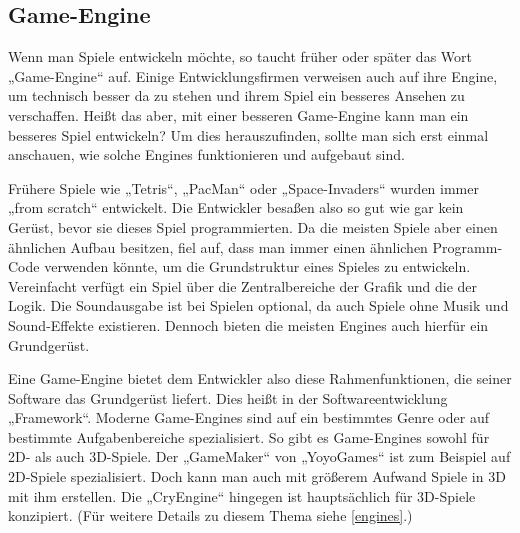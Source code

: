 \subsection{Game-Engine}	
\label{engine}
Wenn man Spiele entwickeln möchte, so taucht früher oder später das Wort „Game-Engine“ auf. Einige Entwicklungsfirmen verweisen auch auf ihre Engine, um technisch besser da zu stehen und ihrem Spiel ein besseres Ansehen zu verschaffen. Heißt das aber, mit einer besseren Game-Engine kann man ein besseres Spiel entwickeln? Um dies herauszufinden, sollte man sich erst einmal anschauen, wie solche Engines funktionieren und aufgebaut sind.

Frühere Spiele wie „Tetris“, „PacMan“ oder „Space-Invaders“ wurden immer „from scratch“  entwickelt.\cite{gea} Die Entwickler besaßen also so gut wie gar kein Gerüst, bevor sie dieses Spiel programmierten. Da die meisten Spiele aber einen ähnlichen Aufbau besitzen, fiel auf, dass man immer einen ähnlichen Programm-Code verwenden könnte, um die Grundstruktur eines Spieles zu entwickeln. Vereinfacht verfügt ein Spiel über die Zentralbereiche der Grafik und die der Logik. Die Soundausgabe ist bei Spielen optional, da auch Spiele ohne Musik und Sound-Effekte existieren. Dennoch bieten die meisten Engines auch hierfür ein Grundgerüst.

Eine Game-Engine bietet dem Entwickler also diese Rahmenfunktionen, die seiner Software das Grundgerüst liefert. Dies heißt in der Softwareentwicklung „Framework“. 
Moderne Game-Engines sind auf ein bestimmtes Genre oder auf bestimmte Aufgabenbereiche spezialisiert. So gibt es Game-Engines sowohl für 2D- als auch 3D-Spiele. Der „GameMaker“ von „YoyoGames“ ist zum Beispiel auf 2D-Spiele spezialisiert. Doch kann man auch mit größerem Aufwand Spiele in 3D mit ihm erstellen.\cite{gamemaker} Die „CryEngine“ hingegen ist hauptsächlich für 3D-Spiele konzipiert.\cite{cryengine} (Für weitere Details zu diesem Thema siehe \ref{engines}.)
